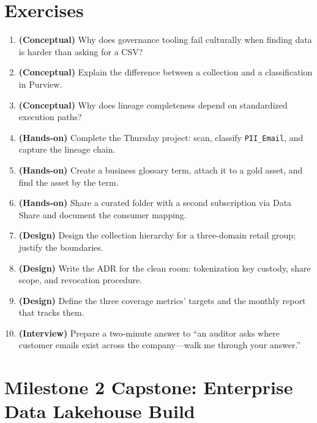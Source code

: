 \section{Exercises}
\begin{enumerate}
    \item \textbf{(Conceptual)} Why does governance tooling fail culturally when finding data is harder than asking for a CSV?
    \item \textbf{(Conceptual)} Explain the difference between a collection and a classification in Purview.
    \item \textbf{(Conceptual)} Why does lineage completeness depend on standardized execution paths?
    \item \textbf{(Hands-on)} Complete the Thursday project: scan, classify \texttt{PII\_Email}, and capture the lineage chain.
    \item \textbf{(Hands-on)} Create a business glossary term, attach it to a gold asset, and find the asset by the term.
    \item \textbf{(Hands-on)} Share a curated folder with a second subscription via Data Share and document the consumer mapping.
    \item \textbf{(Design)} Design the collection hierarchy for a three-domain retail group; justify the boundaries.
    \item \textbf{(Design)} Write the ADR for the clean room: tokenization key custody, share scope, and revocation procedure.
    \item \textbf{(Design)} Define the three coverage metrics' targets and the monthly report that tracks them.
    \item \textbf{(Interview)} Prepare a two-minute answer to ``an auditor asks where customer emails exist across the company---walk me through your answer.''
\end{enumerate}

\section{Milestone 2 Capstone: Enterprise Data Lakehouse Build}\label{sec:ch8-capstone}


